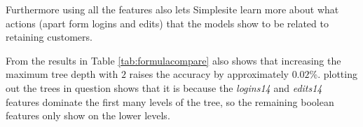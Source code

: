 Furthermore using all the features also lets Simplesite learn more about what
actions (apart form logins and edits) that the models show to be related to
retaining customers.

From the results in Table \ref{tab:formulacompare} also shows that increasing
the maximum tree depth with $2$ raises the accuracy by approximately $0.02$\%.
plotting out the trees in question shows that it is because the
\textit{logins14} and \textit{edits14} features dominate the first many levels
of the tree, so the remaining boolean features only show on the lower levels.
